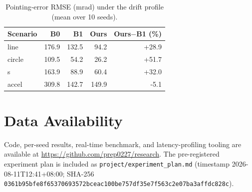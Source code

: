 \documentclass[journal]{IEEEtran}
\begin{document}
\begin{table}[t]\centering\small
\caption{Pointing-error RMSE (mrad) under the drift profile (mean over 10 seeds).}\label{tab:rmse}
\begin{tabular}{lrrrr}
\toprule Scenario & B0 & B1 & Ours & Ours$-$B1 (\%)\\ \midrule
line & 176.9 & 132.5 & 94.2 & +28.9\\
circle & 109.5 & 54.2 & 26.2 & +51.7\\
s & 163.9 & 88.9 & 60.4 & +32.0\\
accel & 309.8 & 142.7 & 149.9 & -5.1\\
\bottomrule\end{tabular}\end{table}
\section*{Data Availability}
Code, per-seed results, real-time benchmark, and latency-profiling tooling are available at \url{https://github.com/prep0227/research}. The pre-registered experiment plan is included as \texttt{project/experiment\_plan.md} (timestamp 2026-08-11T12:41+08:00; SHA-256 \texttt{0361b95b\-fe8f6537\-0693572b\-ceac100b\-e757df35\-e7f563c2\-e07ba3af\-fdc828c}).
\end{document}
